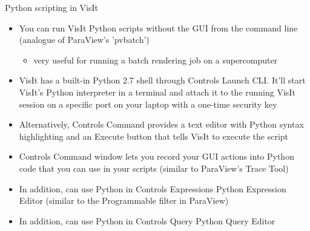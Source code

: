 \begin{comment}
http://www.visitusers.org/index.php?title=VisIt-tutorial-Python-scripting
http://www.visitusers.org/index.php?title=VisIt-tutorial-Advanced-scripting
http://www.visitusers.org/index.php?title=Exporting_databases
abc Tips for searching for help
http://www.visitusers.org/index.php?title=VisIt-tutorial-Python-scripting#Learning_the_CLI
\end{comment}


\begin{frame}{Python scripting in VisIt}{}
  \footnotesize{
    \begin{itemize}\setlength{\itemsep}{1mm}
    \item[\ding{80}] You can run VisIt Python scripts without the GUI from the command line (analogue of
      ParaView's 'pvbatch')\guiless\vspace{-3mm}
      \begin{itemize}\setlength{\itemsep}{0mm}
      \item very useful for running a batch rendering job on a supercomputer
      \end{itemize}
    \item[\ding{80}] VisIt has a built-in Python 2.7 shell through Controls \ra Launch CLI. It'll start
      VisIt's Python interpreter in a terminal and attach it to the running VisIt session on a specific
      port on your laptop with a one-time security key
    \item[\ding{80}] Alternatively, Controls \ra Command provides a text editor with Python syntax
      highlighting and an Execute button that tells VisIt to execute the script
    \item {\color{red}Controls \ra Command window lets you record your GUI actions into Python code that
      you can use in your scripts (similar to ParaView's Trace Tool)}
    \item {\color{blue}In addition, can use Python in Controls \ra Expressions \ra Python Expression
      Editor (similar to the Programmable filter in ParaView)}
    \item {\color{blue}In addition, can use Python in Controls \ra Query \ra Python Query Editor}
    \end{itemize}}
\end{frame}

